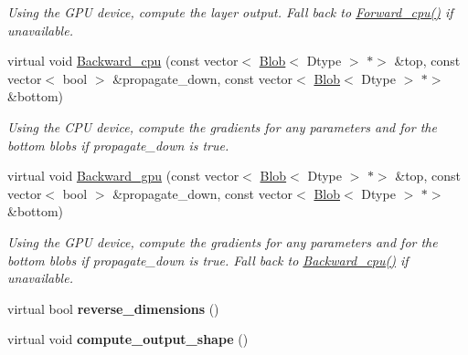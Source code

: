 \begin{DoxyCompactItemize}
\begin{DoxyCompactList}\small\item\em Using the G\+PU device, compute the layer output. Fall back to \mbox{\hyperlink{classcaffe_1_1_deconvolution_layer_a32782e43a4e5edaa7743359f49fda563}{Forward\+\_\+cpu()}} if unavailable. \end{DoxyCompactList}\item 
\mbox{\label{classcaffe_1_1_deconvolution_layer_a08fa65e02e9049b48e49f8fcd3c78951}} 
virtual void \mbox{\hyperlink{classcaffe_1_1_deconvolution_layer_a08fa65e02e9049b48e49f8fcd3c78951}{Backward\+\_\+cpu}} (const vector$<$ \mbox{\hyperlink{classcaffe_1_1_blob}{Blob}}$<$ Dtype $>$ $\ast$$>$ \&top, const vector$<$ bool $>$ \&propagate\+\_\+down, const vector$<$ \mbox{\hyperlink{classcaffe_1_1_blob}{Blob}}$<$ Dtype $>$ $\ast$$>$ \&bottom)
\begin{DoxyCompactList}\small\item\em Using the C\+PU device, compute the gradients for any parameters and for the bottom blobs if propagate\+\_\+down is true. \end{DoxyCompactList}\item 
\mbox{\label{classcaffe_1_1_deconvolution_layer_ab7c4889f3460d4ca2c291c2d10de0d98}} 
virtual void \mbox{\hyperlink{classcaffe_1_1_deconvolution_layer_ab7c4889f3460d4ca2c291c2d10de0d98}{Backward\+\_\+gpu}} (const vector$<$ \mbox{\hyperlink{classcaffe_1_1_blob}{Blob}}$<$ Dtype $>$ $\ast$$>$ \&top, const vector$<$ bool $>$ \&propagate\+\_\+down, const vector$<$ \mbox{\hyperlink{classcaffe_1_1_blob}{Blob}}$<$ Dtype $>$ $\ast$$>$ \&bottom)
\begin{DoxyCompactList}\small\item\em Using the G\+PU device, compute the gradients for any parameters and for the bottom blobs if propagate\+\_\+down is true. Fall back to \mbox{\hyperlink{classcaffe_1_1_deconvolution_layer_a43c00eac97e8c9b3cfb0de0b5904b43f}{Backward\+\_\+cpu()}} if unavailable. \end{DoxyCompactList}\item 
\mbox{\label{classcaffe_1_1_deconvolution_layer_aa71cf7a9ff4cebe12721783070f49588}} 
virtual bool {\bfseries reverse\+\_\+dimensions} ()
\item 
\mbox{\label{classcaffe_1_1_deconvolution_layer_a5e9e13bbc00bcf183273b5847349a224}} 
virtual void {\bfseries compute\+\_\+output\+\_\+shape} ()
\end{DoxyCompactItemize}

